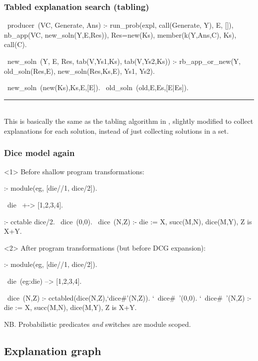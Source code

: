 \documentclass[usenames,dvipsnames]{beamer}
\newenvironment{fframe}[1][untitled]{\begin{frame}[fragile,environment=fframe]\frametitle{{#1}}}{\end{frame}}
\newenvironment{isframe}[1][untitled]{\begin{frame}[fragile=singleslide,environment=isframe]\frametitle{#1}}{\end{frame}}
\begin{document}
\begin{isframe}[Tabled explanation search (tabling)]
\begin{prolog}[xleftmargin=0em,basicstyle=\small]
  ~producer~(VC, Generate, Ans) :-
     run_prob(expl, call(Generate, Y), E, []),
     nb_app(VC, new_soln(Y,E,Res)),
     Res=new(Ks), member(k(Y,Ans,C), Ks), call(C).

  ~new_soln~(Y, E, Res, tab(V,Ys1,Ks), tab(V,Ys2,Ks)) :-
     rb_app_or_new(Y, old_soln(Res,E), new_soln(Res,Ks,E), Ys1, Ys2).

  ~new_soln~(new(Ks),Ks,E,[E]).
  ~old_soln~(old,E,Es,[E|Es]).
\end{prolog}
\vspace{-1.5em}
\rule{\linewidth}{0.4pt}\\
This is basically the same as the tabling algorithm in \citep{Abdallah2017b}, slightly
modified to collect explanations for each solution, instead of just collecting 
solutions in a set.
\end{isframe}

\begin{fframe}[Dice model again]
\begin{onlyenv}<1>%
Before shallow program transformations:
\begin{prolog}[columns=fullflexible,morekeywords={[2]{cctable}}]
  :- module(eg, [die//1, dice/2]).

	~die~ +-> [1,2,3,4].

  :- cctable dice/2.
	~dice~(0,0).
	~dice~(N,Z) :- 
		die := X,
		succ(M,N), dice(M,Y), 
		Z is X+Y.
\end{prolog}
\end{onlyenv}
\begin{onlyenv}<2>%
After program transformations (but before DCG expansion):
\begin{prolog}[columns=fullflexible,morekeywords={[2]{cctable}}]
  :- module(eg, [die//1, dice/2]).

	~die~(eg:die) --> [1,2,3,4].

  ~dice~(N,Z) :- cctabled(dice(N,Z),`dice#'(N,Z)).
	`~dice#~'(0,0).
	`~dice#~'(N,Z) :- 
		die := X,
		succ(M,N), dice(M,Y), 
		Z is X+Y.
\end{prolog}
\end{onlyenv}
NB. Probabilistic predicates \emph{and} switches are module scoped.
\end{fframe}

\subsection{Explanation graph}
\end{document}
